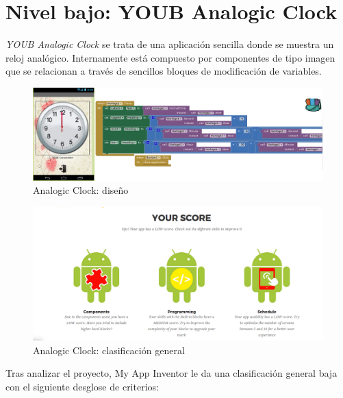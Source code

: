 \documentclass[a4paper, 12pt]{book}
\begin{document}
\section{Nivel bajo: YOUB Analogic Clock} 
\textit{YOUB Analogic Clock} se trata de una aplicación sencilla donde se muestra un reloj analógico. Internamente está compuesto por componentes de tipo imagen que se relacionan a través de sencillos bloques de modificación de variables. 
\begin{figure}[H]
  \centering
  \includegraphics[width=\linewidth, keepaspectratio]{img/AnalogiClock}
  \caption{Analogic Clock: diseño}
  \label{fig:AnalogiClock}
\end{figure}
\begin{figure}[H]
  \centering
  \includegraphics[width=\linewidth, keepaspectratio]{img/AnalogiClockGlobal}
  \caption{Analogic Clock: clasificación general}
  \label{fig:AnalogiClockGLobal}
\end{figure}
Tras analizar el proyecto, My App Inventor le da una clasificación general baja con el siguiente desglose de criterios:
\end{document}
